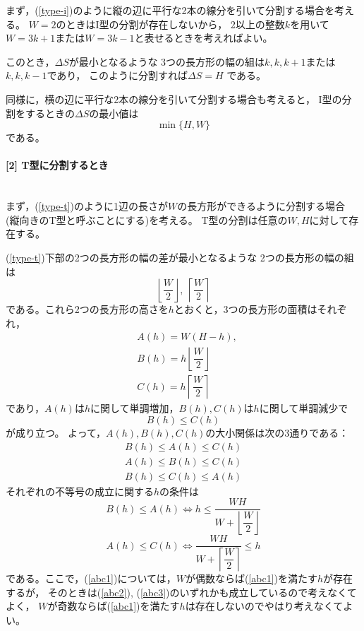 \documentclass{article}
\newcommand{\myparagraph}[1]{\paragraph{#1}\mbox{}\\}
\begin{document}
まず，(\cref{type-i})のように縦の辺に平行な2本の線分を引いて分割する場合を考える。
$W = 2$のときはI型の分割が存在しないから，
2以上の整数$k$を用いて$W = 3k + 1$または$W = 3k - 1$と表せるときを考えればよい。

このとき，$\Delta S$が最小となるような
3つの長方形の幅の組は$k, k, k + 1$または$k, k, k - 1$であり，
このように分割すれば$\Delta S = H$ である。

同様に，横の辺に平行な2本の線分を引いて分割する場合も考えると，
I型の分割をするときの$\Delta S$の最小値は
\begin{equation}
    \label{min-i}
    \min \{H, W\}
\end{equation}
である。

\myparagraph{[2] T型に分割するとき}

まず，(\cref{type-t})のように1辺の長さが$W$の長方形ができるように分割する場合
(縦向きのT型と呼ぶことにする)を考える。
T型の分割は任意の$W, H$に対して存在する。

(\cref{type-t})下部の2つの長方形の幅の差が最小となるような
2つの長方形の幅の組は
\begin{equation}
    \label{w2}
    \left\lfloor \dfrac{W}{2} \right\rfloor,\ \left\lceil \dfrac{W}{2} \right\rceil
\end{equation}
である。これら2つの長方形の高さを$h$とおくと，3つの長方形の面積はそれぞれ，
\begin{eqnarray*}
    &A(h) = W (H - h), \\
    &B(h) = h \left\lfloor \dfrac{W}{2} \right\rfloor \\
    &C(h) = h \left\lceil  \dfrac{W}{2} \right\rceil
\end{eqnarray*}
であり，$A(h)$は$h$に関して単調増加，$B(h), C(h)$は$h$に関して単調減少で
\begin{equation}
    \label{b_c}
    B(h) \leq C(h)
\end{equation}
が成り立つ。
よって，$A(h), B(h), C(h)$の大小関係は次の3通りである：
\begin{eqnarray}
    \label{abc1}
    B(h) \leq A(h) \leq C(h) \\
    \label{abc2}
    A(h) \leq B(h) \leq C(h) \\
    \label{abc3}
    B(h) \leq C(h) \leq A(h)
\end{eqnarray}
それぞれの不等号の成立に関する$h$の条件は
\begin{equation*}
    B(h) \leq A(h)
    \Longleftrightarrow
    h \leq
    \dfrac{WH}{ W + \left\lfloor \dfrac{W}{2} \right\rfloor }
\end{equation*}
\begin{equation*}
    A(h) \leq C(h)
    \Longleftrightarrow
    \dfrac{WH}{ W + \left\lceil \dfrac{W}{2} \right\rceil }
    \leq h
\end{equation*}
である。ここで，(\ref{abc1})については，$W$が偶数ならば(\ref{abc1})を満たす$h$が存在するが，
そのときは(\ref{abc2}), (\ref{abc3})のいずれかも成立しているので考えなくてよく，
$W$が奇数ならば(\ref{abc1})を満たす$h$は存在しないのでやはり考えなくてよい。
\end{document}
